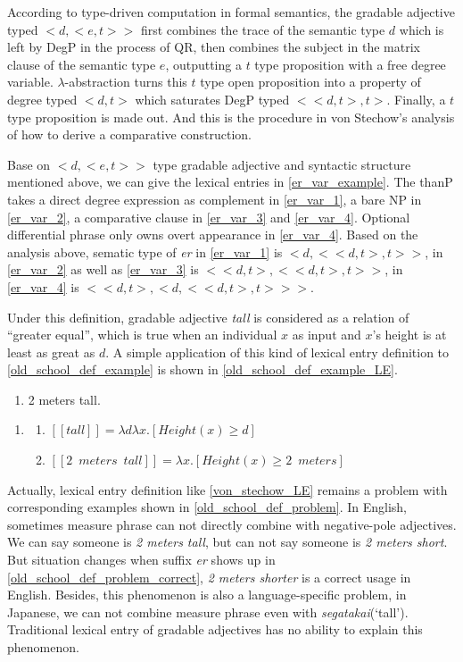 \documentclass{ctexart}
\begin{document}
According to type-driven computation in formal semantics, the gradable adjective typed $<d,<e,t>>$ first combines the trace of the semantic type $d$ which is left by DegP in the process of QR, then combines the subject in the matrix clause of the semantic type $e$, outputting a $t$ type proposition with a free degree variable. $\lambda$-abstraction turns this $t$ type open proposition into a property of degree typed $<d,t>$ which saturates DegP typed $<<d,t>,t>$. Finally, a $t$ type proposition is made out. And this is the procedure in von Stechow's analysis of how to derive a comparative construction.

Base on $<d,<e,t>>$ type gradable adjective and syntactic structure mentioned above, we can give the lexical entries in \ref{er_var_example}. The thanP takes a direct degree expression as complement in \ref{er_var_1}, a bare NP in \ref{er_var_2}, a comparative clause in \ref{er_var_3} and \ref{er_var_4}. Optional differential phrase only owns overt appearance in \ref{er_var_4}. Based on the analysis above, sematic type of \textit{er} in \ref{er_var_1} is $<d,<<d,t>,t>>$, in \ref{er_var_2} as well as \ref{er_var_3} is $<<d,t>,<<d,t>,t>>$, in \ref{er_var_4} is $<<d,t>,<d,<<d,t>,t>>>$.

Under this definition, gradable adjective \textit{tall} is considered as a relation of ``greater equal'', which is true when an individual $x$ as input and $x$'s height is at least as great as $d$. A simple application of this kind of lexical entry definition to \ref{old_school_def_example} is shown in \ref{old_school_def_example_LE}.

\begin{enumerate}
    \item \label{old_school_def_example} 2 meters tall.
\end{enumerate}

\begin{enumerate}
    \item \label{old_school_def_example_LE}
    \begin{enumerate}
        \item $[\![tall]\!]=\lambda d \lambda x.[Height(x) \geq d]$
        \item $[\![2 \enspace meters \enspace tall]\!]=\lambda x.[Height(x) \geq 2 \enspace meters]$
    \end{enumerate}
\end{enumerate}

Actually, lexical entry definition like \ref{von_stechow_LE} remains a problem with corresponding examples shown in \ref{old_school_def_problem}. In English, sometimes measure phrase can not directly combine with negative-pole adjectives. We can say someone is \textit{2 meters tall}, but can not say someone is \textit{2 meters short}. But situation changes when suffix \textit{er} shows up in \ref{old_school_def_problem_correct}, \textit{2 meters shorter} is a correct usage in English. Besides, this phenomenon is also a language-specific problem, in Japanese, we can not combine measure phrase even with \textit{segatakai}(`tall'). Traditional lexical entry of gradable adjectives has no ability to explain this phenomenon.
\end{document}
